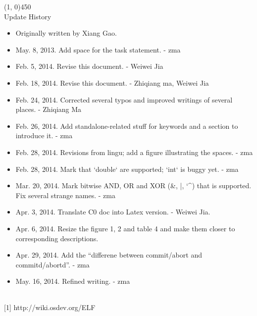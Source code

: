 \documentclass[a4paper]{article}
\begin{document}
\line(1, 0){450}\\

Update History\\

\begin{itemize}
	\item Originally written by Xiang Gao.
	\item May. 8, 2013. Add space for the task statement. - zma
	\item Feb. 5, 2014. Revise this document. - Weiwei Jia
	\item Feb. 18, 2014. Revise this document. - Zhiqiang ma, Weiwei Jia
	\item Feb. 24, 2014. Corrected several typos and improved writings of several places. - Zhiqiang Ma
	\item Feb. 26, 2014. Add standalone-related stuff for keywords and a section to introduce it. - zma
	\item Feb. 28, 2014. Revisions from lingu; add a figure illustrating the spaces. - zma
	\item Feb. 28, 2014. Mark that `double` are supported; `int` is buggy yet. - zma
	\item Mar. 20, 2014. Mark bitwise AND, OR and XOR (\&, |, {\char`\^}) that is supported. Fix several strange names. - zma
	\item Apr. 3, 2014. Translate C0 doc into Latex version. - Weiwei Jia.
    \item Apr. 6, 2014. Resize the figure 1, 2 and table 4 and make them closer to corresponding descriptions.
    \item Apr. 29, 2014. Add the ``differene between commit/abort and commitd/abortd''. - zma
    \item May. 16, 2014. Refined writing. - zma
\end{itemize}

\\

[1] http://wiki.osdev.org/ELF
\end{document}
